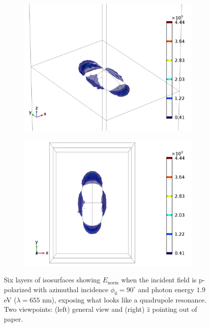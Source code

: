 \begin{figure}
    \begin{subfigure}{0.49\textwidth}
        \centering
        \includegraphics[width=\linewidth]{figures/ch4/S5B/fielddistr/s5b_normE_TM_wl655_phi90_view_legend1.png}
    \end{subfigure}
    \begin{subfigure}{0.49\textwidth}
        \centering
        \includegraphics[width=\linewidth]{figures/ch4/S5B/fielddistr/s5b_normE_TM_wl655_phi90_zview_legend.png}
    \end{subfigure}
    \caption{Six layers of isosurfaces showing $E_\text{norm}$ when the incident field is p-polarized with azimuthal incidence $\phi_0=90^\circ$ and photon energy $1.9$ eV ($\lambda=655$ nm), exposing what looks like a quadrupole resonance. Two viewpoints: (left) general view and (right) $\hat{z}$ pointing out of paper.}
    \label{fig:S5B_fielddistr_multipole}
\end{figure}
